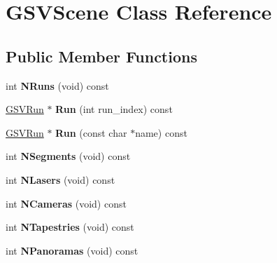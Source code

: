 \hypertarget{class_g_s_v_scene}{}\section{G\+S\+V\+Scene Class Reference}
\label{class_g_s_v_scene}
\subsection*{Public Member Functions}
\begin{DoxyCompactItemize}
\item 
int {\bfseries N\+Runs} (void) const \hypertarget{class_g_s_v_scene_a2e86a4322ad471830f69d18ad9bc5579}{}\label{class_g_s_v_scene_a2e86a4322ad471830f69d18ad9bc5579}

\item 
\hyperlink{class_g_s_v_run}{G\+S\+V\+Run} $\ast$ {\bfseries Run} (int run\+\_\+index) const \hypertarget{class_g_s_v_scene_a30fb81e2db0d7032667e7e70144d1bb8}{}\label{class_g_s_v_scene_a30fb81e2db0d7032667e7e70144d1bb8}

\item 
\hyperlink{class_g_s_v_run}{G\+S\+V\+Run} $\ast$ {\bfseries Run} (const char $\ast$name) const \hypertarget{class_g_s_v_scene_a9776044609c38d36050ee37f643fdefa}{}\label{class_g_s_v_scene_a9776044609c38d36050ee37f643fdefa}

\item 
int {\bfseries N\+Segments} (void) const \hypertarget{class_g_s_v_scene_ac8bc1817ad8839fbe7c7bffc21f32f58}{}\label{class_g_s_v_scene_ac8bc1817ad8839fbe7c7bffc21f32f58}

\item 
int {\bfseries N\+Lasers} (void) const \hypertarget{class_g_s_v_scene_a2e73301c2b44d904064e85fbc55f4625}{}\label{class_g_s_v_scene_a2e73301c2b44d904064e85fbc55f4625}

\item 
int {\bfseries N\+Cameras} (void) const \hypertarget{class_g_s_v_scene_afeb2d8defba862fced378c15c9ae029f}{}\label{class_g_s_v_scene_afeb2d8defba862fced378c15c9ae029f}

\item 
int {\bfseries N\+Tapestries} (void) const \hypertarget{class_g_s_v_scene_ab093ffb738a94ea3031b79948e2d6d3a}{}\label{class_g_s_v_scene_ab093ffb738a94ea3031b79948e2d6d3a}

\item 
int {\bfseries N\+Panoramas} (void) const \hypertarget{class_g_s_v_scene_af5450b6545217548201dda6099572a6e}{}\label{class_g_s_v_scene_af5450b6545217548201dda6099572a6e}


\end{DoxyCompactItemize}
